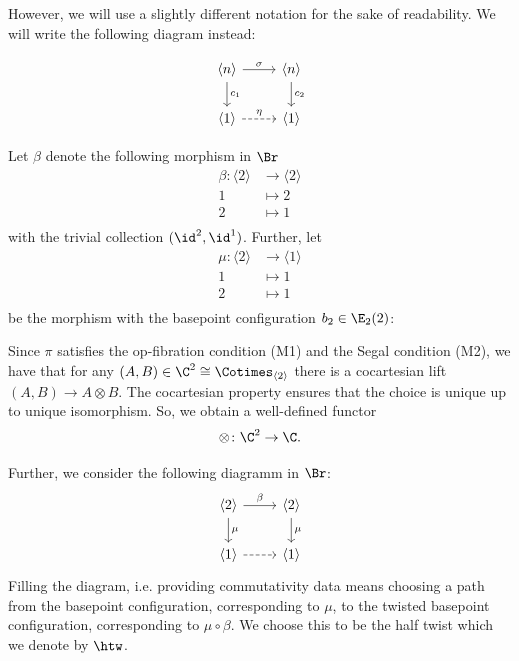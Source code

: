 However, we will use a slightly different notation for the sake of readability.
We will write the following diagram instead:

\[    
    \begin{tikzcd}
        \langle n \rangle \arrow[r, "\sigma"] \arrow[d, "c_1"] & \langle n \rangle \arrow[d, "c_2"] \\
        \langle 1 \rangle  \arrow[r, dashed, "\eta"]                  & \langle 1 \rangle                
    \end{tikzcd}
\]

Let $\beta$ denote the following morphism in $\Br$
     \begin{align*}
         \beta \colon \langle 2 \rangle &\to \langle 2 \rangle \\
         1 &\mapsto 2 \\
         2 &\mapsto 1 \\
     \end{align*}
with the trivial collection $(\id^2, \id^1)$.
Further, let 
\begin{align*}
    \mu \colon \langle 2 \rangle &\to \langle 1 \rangle \\
    1 &\mapsto 1 \\
    2 &\mapsto 1 \\
\end{align*}
be the morphism with the basepoint configuration $b_2 \in \E_2(2)$:
\begin{center}
\end{center}

Since $\pi$ satisfies the op-fibration condition (M1) and the Segal condition (M2), we have that for any $(A,B) \in \C^2 \cong \Cotimes_{\langle 2 \rangle}$ 
there is a cocartesian lift $(A,B) \to A \otimes B$. The cocartesian property ensures that the choice is 
unique up to unique isomorphism.
So, we obtain a well-defined functor
\[
    \otimes \colon \C^2 \to \C.
\]

Further, we consider the following diagramm in $\Br$:
\[    
    \begin{tikzcd}
        \langle 2 \rangle \arrow[r, "\beta"] \arrow[d, "\mu"] & \langle 2 \rangle \arrow[d, "\mu"] \\
        \langle 1 \rangle  \arrow[r, dashed]                  & \langle 1 \rangle                
    \end{tikzcd}
\]
Filling the diagram, i.e. providing commutativity data means choosing a path 
from the basepoint configuration, corresponding to $\mu$, 
to the twisted basepoint configuration, corresponding to $\mu \circ \beta$. 
We choose this to be the half twist which we denote by $\htw$.

